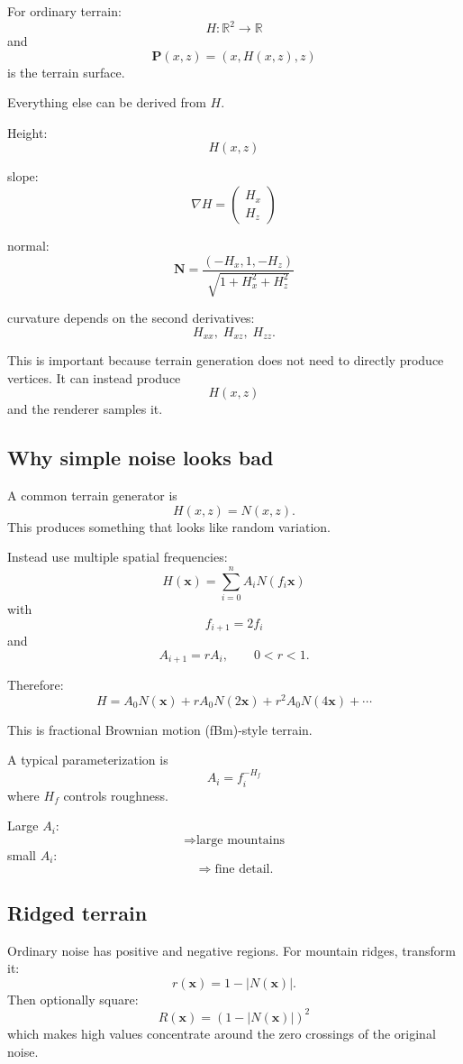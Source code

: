 \documentclass[12pt]{article}
\begin{document}
	For ordinary terrain:
	\[
	H:\mathbb R^2\rightarrow\mathbb R
	\]
	and
	\[
	\boxed{\mathbf P(x,z)= (x,H(x,z),z)}
	\]
	is the terrain surface.
	
	Everything else can be derived from $H$.
	
	Height:
	\[
	H(x,z)
	\]
	
	slope:
	\[
	\nabla H=
	\begin{pmatrix}
		H_x \\
		H_z
	\end{pmatrix}
	\]
	
	normal:
	\[
	\boxed{
		\mathbf N=
		\frac{(-H_x,1,-H_z)}
		{\sqrt{1+H_x^2+H_z^2}}
	}
	\]
	
	curvature depends on the second derivatives:
	\[
	H_{xx},\; H_{xz},\; H_{zz}.
	\]
	
	This is important because terrain generation does not need to directly produce vertices.
	It can instead produce
	\[
	H(x,z)
	\]
	and the renderer samples it.
	
	\subsection{Why simple noise looks bad}
	
	A common terrain generator is
	\[
	H(x,z)=N(x,z).
	\]
	This produces something that looks like random variation.
	
	Instead use multiple spatial frequencies:
	\[
	\boxed{
		H(\mathbf x)=
		\sum_{i=0}^{n} A_i N(f_i \mathbf x)
	}
	\]
	with
	\[
	f_{i+1}=2f_i
	\]
	and
	\[
	A_{i+1}=rA_i, \qquad 0<r<1.
	\]
	
	Therefore:
	\[
	H=
	A_0 N(\mathbf x)
	+ rA_0 N(2\mathbf x)
	+ r^2 A_0 N(4\mathbf x)
	+\cdots
	\]
	
	This is fractional Brownian motion (fBm)-style terrain.
	
	A typical parameterization is
	\[
	A_i=f_i^{-H_f}
	\]
	where $H_f$ controls roughness.
	
	Large $A_i$:
	\[
	\Rightarrow \text{large mountains}
	\]
	small $A_i$:
	\[
	\Rightarrow \text{fine detail}.
	\]
	
	\subsection{Ridged terrain}
	
	Ordinary noise has positive and negative regions.
	For mountain ridges, transform it:
	\[
	r(\mathbf x)=1-|N(\mathbf x)|.
	\]
	Then optionally square:
	\[
	\boxed{
		R(\mathbf x)=
		\left(1-|N(\mathbf x)|\right)^2
	}
	\]
	which makes high values concentrate around the zero crossings of the original noise.
	
\end{document}
